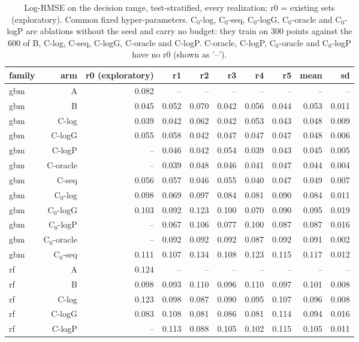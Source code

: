 \begin{table}[htbp]
\centering
\caption{Log-RMSE on the decision range, test-stratified, every realization; r0 = existing sets (exploratory). Common fixed hyper-parameters. C$_0$-log, C$_0$-seq, C$_0$-logG, C$_0$-oracle and C$_0$-logP are ablations without the seed and carry no budget: they train on 300 points against the 600 of B, C-log, C-seq, C-logG, C-oracle and C-logP. C-oracle, C-logP, C$_0$-oracle and C$_0$-logP have no r0 (shown as '--').}
\label{tab:rep:test-stratified:values}
\begin{tabular}{lrrrrrrrrr}
\toprule
family & arm & r0 (exploratory) & r1 & r2 & r3 & r4 & r5 & mean & sd \\
\midrule
gbm & A & 0.082 & -- & -- & -- & -- & -- & -- & -- \\
gbm & B & 0.045 & 0.052 & 0.070 & 0.042 & 0.056 & 0.044 & 0.053 & 0.011 \\
gbm & C-log & 0.039 & 0.042 & 0.062 & 0.042 & 0.053 & 0.043 & 0.048 & 0.009 \\
gbm & C-logG & 0.055 & 0.058 & 0.042 & 0.047 & 0.047 & 0.047 & 0.048 & 0.006 \\
gbm & C-logP & -- & 0.046 & 0.042 & 0.054 & 0.039 & 0.043 & 0.045 & 0.005 \\
gbm & C-oracle & -- & 0.039 & 0.048 & 0.046 & 0.041 & 0.047 & 0.044 & 0.004 \\
gbm & C-seq & 0.056 & 0.057 & 0.046 & 0.055 & 0.040 & 0.047 & 0.049 & 0.007 \\
gbm & C$_0$-log & 0.098 & 0.069 & 0.097 & 0.084 & 0.081 & 0.090 & 0.084 & 0.011 \\
gbm & C$_0$-logG & 0.103 & 0.092 & 0.123 & 0.100 & 0.070 & 0.090 & 0.095 & 0.019 \\
gbm & C$_0$-logP & -- & 0.067 & 0.106 & 0.077 & 0.100 & 0.087 & 0.087 & 0.016 \\
gbm & C$_0$-oracle & -- & 0.092 & 0.092 & 0.092 & 0.087 & 0.092 & 0.091 & 0.002 \\
gbm & C$_0$-seq & 0.111 & 0.107 & 0.134 & 0.108 & 0.123 & 0.115 & 0.117 & 0.012 \\
rf & A & 0.124 & -- & -- & -- & -- & -- & -- & -- \\
rf & B & 0.098 & 0.093 & 0.110 & 0.096 & 0.110 & 0.097 & 0.101 & 0.008 \\
rf & C-log & 0.123 & 0.098 & 0.087 & 0.090 & 0.095 & 0.107 & 0.096 & 0.008 \\
rf & C-logG & 0.083 & 0.108 & 0.081 & 0.086 & 0.081 & 0.114 & 0.094 & 0.016 \\
rf & C-logP & -- & 0.113 & 0.088 & 0.105 & 0.102 & 0.115 & 0.105 & 0.011 \\

\end{tabular}
\end{table}
